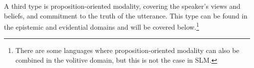 %  
% 
% 
% 
% 
% 
% 

%



A third type is proposition-oriented modality, covering the speaker's views and beliefs, and commitment to the truth of the utterance. This type can be found in the  epistemic and evidential domains and will be covered below.\footnote{There are some languages where proposition-oriented modality can also be combined in the volitive domain, but this is not the case in SLM.}

